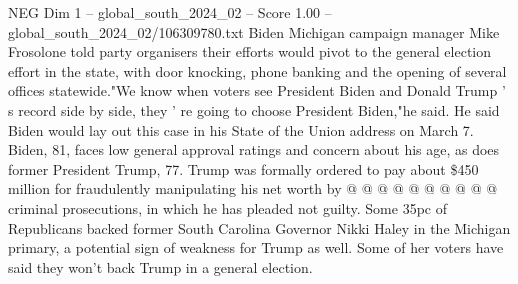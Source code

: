 \begin{textsample}{NEG Dim 1 – global\_south\_2024\_02 – Score 1.00 – global\_south\_2024\_02/106309780.txt}
Biden Michigan campaign manager Mike Frosolone told party organisers their efforts would pivot to the general election effort in the state, with door knocking, phone banking and the opening of several offices statewide."We know when voters see President Biden and Donald Trump ' s record side by side, they ' re going to choose President Biden,"he said.
He said Biden would lay out this case in his State of the Union address on March 7.
Biden, 81, faces low general approval ratings and concern about his age, as does former President Trump, 77.
Trump was formally ordered to pay about \$450 million for fraudulently manipulating his net worth by @ @ @ @ @ @ @ @ @ @ criminal prosecutions, in which he has pleaded not guilty.
Some 35pc of Republicans backed former South Carolina Governor Nikki Haley in the Michigan primary, a potential sign of weakness for Trump as well.
Some of her voters have said they won't back Trump in a general election.

\end{textsample}
